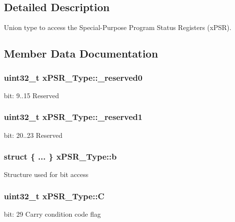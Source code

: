 \subsection{Detailed Description}
Union type to access the Special-\/\+Purpose Program Status Registers (x\+P\+SR). 

\subsection{Member Data Documentation}
\subsubsection[{\texorpdfstring{\+\_\+reserved0}{_reserved0}}]{\setlength{\rightskip}{0pt plus 5cm}uint32\+\_\+t x\+P\+S\+R\+\_\+\+Type\+::\+\_\+reserved0}\hypertarget{unionx_p_s_r___type_af438e0f407357e914a70b5bd4d6a97c5}{}\label{unionx_p_s_r___type_af438e0f407357e914a70b5bd4d6a97c5}
bit\+: 9..15 Reserved 
\subsubsection[{\texorpdfstring{\+\_\+reserved1}{_reserved1}}]{\setlength{\rightskip}{0pt plus 5cm}uint32\+\_\+t x\+P\+S\+R\+\_\+\+Type\+::\+\_\+reserved1}\hypertarget{unionx_p_s_r___type_a790056bb6f20ea16cecc784b0dd19ad6}{}\label{unionx_p_s_r___type_a790056bb6f20ea16cecc784b0dd19ad6}
bit\+: 20..23 Reserved 
\subsubsection[{\texorpdfstring{b}{b}}]{\setlength{\rightskip}{0pt plus 5cm}struct \{ ... \}   x\+P\+S\+R\+\_\+\+Type\+::b}\hypertarget{unionx_p_s_r___type_a3b1063bb5cdad67e037cba993b693b70}{}\label{unionx_p_s_r___type_a3b1063bb5cdad67e037cba993b693b70}
Structure used for bit access 
\subsubsection[{\texorpdfstring{C}{C}}]{\setlength{\rightskip}{0pt plus 5cm}uint32\+\_\+t x\+P\+S\+R\+\_\+\+Type\+::C}\hypertarget{unionx_p_s_r___type_a40213a6b5620410cac83b0d89564609d}{}\label{unionx_p_s_r___type_a40213a6b5620410cac83b0d89564609d}
bit\+: 29 Carry condition code flag 
